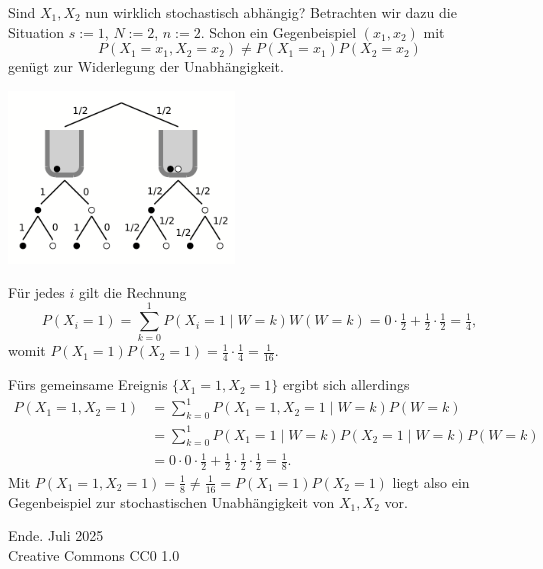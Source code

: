\documentclass[8pt]{beamer}
\newcommand{\modest}[1]{{\small\color{gray}#1}}
\newcommand{\parspace}{\vspace{0.8em}}
\begin{document}
\begin{frame}
Sind $X_1,X_2$ nun wirklich stochastisch abhängig? Betrachten wir dazu
die Situation $s:=1$, $N:=2$, $n:=2$. Schon ein Gegenbeispiel $(x_1,x_2)$
mit
\[P(X_1=x_1,X_2=x_2)\ne P(X_1=x_1)P(X_2=x_2)\]
genügt zur Widerlegung der Unabhängigkeit.

\begin{center}
\includegraphics[width=60mm]{img/Urnen22.pdf}
\end{center}
\end{frame}

\begin{frame}
Für jedes $i$ gilt die Rechnung
\[P(X_i=1) = \sum_{k=0}^1 P(X_i=1\mid W=k)W(W=k) =
0\cdot\tfrac{1}{2} + \tfrac{1}{2}\cdot\tfrac{1}{2} = \tfrac{1}{4},\]
womit $P(X_1=1)P(X_2=1)=\tfrac{1}{4}\cdot\tfrac{1}{4}=\tfrac{1}{16}$.\pause

\parspace
Fürs gemeinsame Ereignis $\{X_1=1,X_2=1\}$ ergibt sich allerdings
\begin{align*}
P(X_1=1,X_2=1) &= \sum_{k=0}^1 P(X_1=1,X_2=1\mid W=k)P(W=k)\\
&= \sum_{k=0}^1 P(X_1=1\mid W=k)P(X_2=1\mid W=k)P(W=k)\\
&= 0\cdot 0\cdot\tfrac{1}{2} + \tfrac{1}{2}\cdot\tfrac{1}{2}\cdot\tfrac{1}{2}
= \tfrac{1}{8}.
\end{align*}\pause
Mit $P(X_1=1,X_2=1)=\tfrac{1}{8}\ne\tfrac{1}{16}=P(X_1=1)P(X_2=1)$
liegt also ein Gegenbeispiel zur stochastischen Unabhängigkeit von
$X_1,X_2$ vor.
\end{frame}

\begin{frame}
Ende.
\vfill\hfill\modest{Juli 2025}\\
\hfill\modest{Creative Commons CC0 1.0}
\end{frame}
\end{document}
